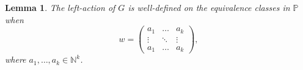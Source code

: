 \documentclass{amsart}
\newcommand{\C}{\mathbb{C}}
\newcommand{\N}{\mathbb{N}}
\newcommand{\Proj}{\mathbb{P}}
\DeclareMathOperator{\End}{End}
\DeclareMathOperator{\SL}{SL}
\newtheorem{lemma}[theorem]{Lemma}
\theoremstyle{definition}
\theoremstyle{remark}
\numberwithin{equation}{section}
\begin{document}


\begin{lemma}
The left-action of $G$ is well-defined on the equivalence classes in $\Proj$ when
\[w = \left(\begin{array}{ccc} a_1&\hdots&a_k\\ \vdots&\ddots&\vdots\\ a_1&\hdots&a_k \end{array} \right),\]
    where $a_1,\ldots,a_k\in \N^k$.
\label{lem:welldef}
\end{lemma}
\end{document}
